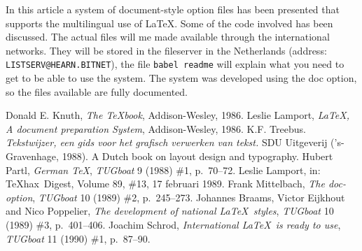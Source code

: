\documentclass{ltugboat}
\newcommand\TeXhax{\TeX hax}}
\newcommand{\file}[1]{\texttt{#1}}
\newcommand{\Lopt}[1]{\textsf{#1}}
\begin{document}
In this article a system of document-style option files has been
presented that supports the multilingual use of \LaTeX. Some of the
code involved has been discussed. The actual files will me made
available through the international networks. They will be stored in
the fileserver in the Netherlands (address:
\texttt{LISTSERV@HEARN.BITNET}), the file \file{babel readme} will
explain what you need to get to be able to use the system. The system
was developed using the \Lopt{doc} option, so the files available are
fully documented.

\begin{thebibliography}{9}
  Donald E. Knuth,
   \emph{The \TeX book}, Addison-Wesley, 1986.
  Leslie Lamport,
   \emph{\LaTeX, A document preparation System}, Addison-Wesley, 1986.
   K.F. Treebus.
  \emph{Tekstwijzer, een gids voor het grafisch verwerken van tekst.}
  SDU Uitgeverij ('s-Gravenhage, 1988). A Dutch book on layout
  design and typography.
  Hubert Partl,
   \emph{German \TeX}, \emph{TUGboat} 9 (1988) \#1, p.~70--72.
  Leslie Lamport,
   in: \TeXhax\ Digest, Volume 89, \#13, 17 februari 1989.
 Frank Mittelbach,
  \emph{The \Lopt{doc}-option},
  \emph{TUGboat} 10 (1989) \#2, p.~245--273.
 Johannes Braams, Victor Eijkhout and Nico Poppelier,
  \emph{The development of national \LaTeX\ styles},
  \emph{TUGboat} 10 (1989) \#3, p.~401--406.
 Joachim Schrod,
  \emph{International \LaTeX\ is ready to use},
  \emph{TUGboat} 11 (1990) \#1, p.~87--90.
\end{thebibliography}
\end{document}
